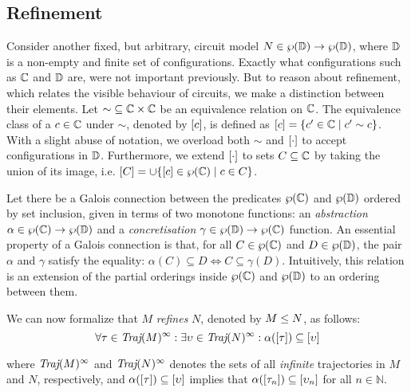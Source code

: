 \subsection{Refinement}

Consider another fixed, but arbitrary, circuit model $N \in \wp(\mathbb{D}) \rightarrow \wp(\mathbb{D})$, where $\mathbb{D}$ is a non-empty and finite set of configurations. Exactly what configurations such as $\mathbb{C}$ and $\mathbb{D}$ are, were not important previously. But to reason about refinement, which relates the visible behaviour of circuits, we make a distinction between their elements. Let ${\sim} \subseteq \mathbb{C} \times \mathbb{C}$ be an equivalence relation on $\mathbb{C}$. The equivalence class of a $c \in \mathbb{C}$ under $\sim$, denoted by $[c]$, is defined as $[c] = \{ c' \in \mathbb{C} \mid c' \sim c \}$. With a slight abuse of notation, we overload both $\sim$ and $[\cdot]$ to accept configurations in $\mathbb{D}$. Furthermore, we extend $[\cdot]$ to sets $C \subseteq \mathbb{C}$ by taking the union of its image, i.e. $[C] = \cup\{[c] \in \wp(\mathbb{C}) \mid c \in C \}$.


Let there be a Galois connection between the predicates $\wp(\mathbb{C})$ and $\wp(\mathbb{D})$ ordered by set inclusion, given in terms of two monotone functions: an \textit{abstraction} $\alpha \in \wp(\mathbb{C}) \rightarrow \wp(\mathbb{D})$ and a \textit{concretisation} $\gamma \in \wp(\mathbb{D}) \rightarrow \wp(\mathbb{C})$ function. An essential property of a Galois connection is that, for all $C \in \wp(\mathbb{C})$ and $D \in \wp(\mathbb{D})$, the pair $\alpha$ and $\gamma$ satisfy the equality: $\alpha(C) \subseteq D \iff C \subseteq \gamma(D)$. Intuitively, this relation is an extension of the partial orderings inside $\wp(\mathbb{C})$ and $\wp(\mathbb{D})$ to an ordering between them. 


We can now formalize that $M$ \textit{refines} $N$, denoted by $M \leq N$, as follows:
%
\begin{equation*}
\forall \tau \in \operatorname{\textit{Traj}}(M)^{\infty} : \exists \upsilon \in \operatorname{\textit{Traj}}(N)^{\infty} : \alpha([\tau]) \subseteq [\upsilon]
\end{equation*}

\noindent where $\operatorname{\textit{Traj}}(M)^{\infty}$ and $\operatorname{\textit{Traj}}(N)^{\infty}$ denotes the sets of all \textit{infinite} trajectories in $M$ and $N$, respectively, and $\alpha([\tau]) \subseteq [\upsilon]$ implies that $\alpha([\tau_{n}]) \subseteq [\upsilon_{n}]$ for all $n \in \mathbb{N}$.  

